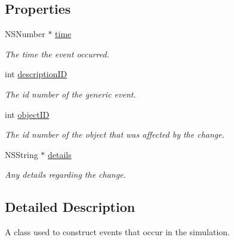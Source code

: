 \subsection*{Properties}
\begin{DoxyCompactItemize}
\item 
\hypertarget{interface_event_a7999a182561543e6f8a6b11633fdf26f}{N\-S\-Number $\ast$ \hyperlink{interface_event_a7999a182561543e6f8a6b11633fdf26f}{time}}\label{interface_event_a7999a182561543e6f8a6b11633fdf26f}

\begin{DoxyCompactList}\small\item\em The time the event occurred. \end{DoxyCompactList}\item 
\hypertarget{interface_event_aecb5d4221768a4af5d82df3420a25339}{int \hyperlink{interface_event_aecb5d4221768a4af5d82df3420a25339}{description\-I\-D}}\label{interface_event_aecb5d4221768a4af5d82df3420a25339}

\begin{DoxyCompactList}\small\item\em The id number of the generic event. \end{DoxyCompactList}\item 
\hypertarget{interface_event_a32f790016241cf78c44782a6007a744f}{int \hyperlink{interface_event_a32f790016241cf78c44782a6007a744f}{object\-I\-D}}\label{interface_event_a32f790016241cf78c44782a6007a744f}

\begin{DoxyCompactList}\small\item\em The id number of the object that was affected by the change. \end{DoxyCompactList}\item 
\hypertarget{interface_event_a8fc6cd2b92f759c4e2a74e32d615e4dd}{N\-S\-String $\ast$ \hyperlink{interface_event_a8fc6cd2b92f759c4e2a74e32d615e4dd}{details}}\label{interface_event_a8fc6cd2b92f759c4e2a74e32d615e4dd}

\begin{DoxyCompactList}\small\item\em Any details regarding the change. \end{DoxyCompactList}\end{DoxyCompactItemize}


\subsection{Detailed Description}
A class used to construct events that occur in the simulation. 

